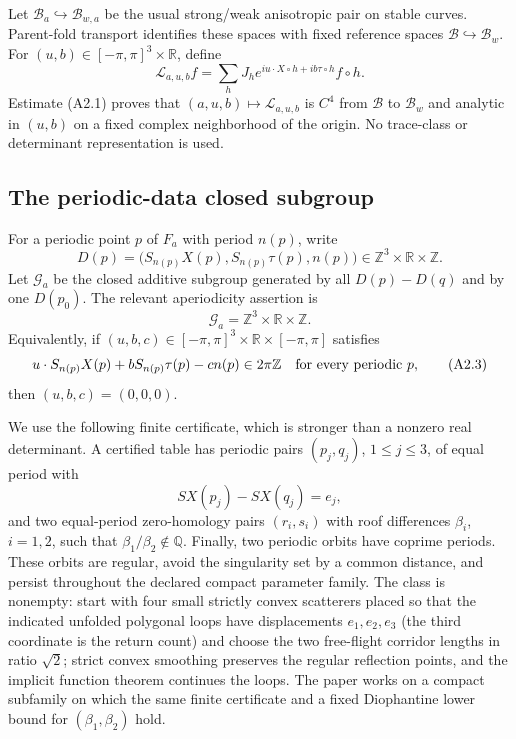 Let $\mathcal B_a\hookrightarrow\mathcal B_{w,a}$ be the usual strong/weak
anisotropic pair on stable curves.  Parent-fold transport identifies these
spaces with fixed reference spaces $\mathcal B\hookrightarrow\mathcal B_w$.
For $(u,b)\in[-\pi,\pi]^3\times\mathbb R$, define
\[
 \mathcal L_{a,u,b}f
 =\sum_h J_h e^{i u\cdot X\circ h+i b\tau\circ h}f\circ h.
\]
Estimate (A2.1) proves that $(a,u,b)\mapsto\mathcal L_{a,u,b}$ is $C^4$ from
$\mathcal B$ to $\mathcal B_w$ and analytic in $(u,b)$ on a fixed complex
neighborhood of the origin.  No trace-class or determinant representation is
used.

\subsection{The periodic-data closed subgroup}

For a periodic point $p$ of $F_a$ with period $n(p)$, write
\[
 D(p)=\bigl(S_{n(p)}X(p),S_{n(p)}\tau(p),n(p)\bigr)
       \in\mathbb Z^3\times\mathbb R\times\mathbb Z.
\]
Let $\mathscr G_a$ be the closed additive subgroup generated by all
$D(p)-D(q)$ and by one $D(p_0)$.  The relevant aperiodicity assertion is
\[
 \mathscr G_a=\mathbb Z^3\times\mathbb R\times\mathbb Z.       \tag{A2.2}
\]
Equivalently, if $(u,b,c)\in[-\pi,\pi]^3\times\mathbb R\times[-\pi,\pi]$
satisfies
\[
 u\cdot S_{n(p)}X(p)+bS_{n(p)}\tau(p)-c n(p)\in2\pi\mathbb Z
 \quad\hbox{for every periodic }p,                         \tag{A2.3}
\]
then $(u,b,c)=(0,0,0)$.

We use the following finite certificate, which is stronger than a nonzero real
determinant.  A certified table has periodic pairs $(p_j,q_j)$,
$1\le j\le3$, of equal period with
\[
 S X(p_j)-S X(q_j)=e_j,
\]
and two equal-period zero-homology pairs $(r_i,s_i)$ with roof differences
$\beta_i$, $i=1,2$, such that $\beta_1/\beta_2\notin\mathbb Q$.  Finally, two
periodic orbits have coprime periods.  These orbits are regular, avoid the
singularity set by a common distance, and persist throughout the declared
compact parameter family.  The class is nonempty: start with four small
strictly convex scatterers placed so that the indicated unfolded polygonal
loops have displacements $e_1,e_2,e_3$ (the third coordinate is the return
count) and choose the two free-flight corridor lengths in ratio $\sqrt2$;
strict convex smoothing preserves the regular reflection points, and the
implicit function theorem continues the loops.  The paper works on a compact
subfamily on which the same finite certificate and a fixed Diophantine lower
bound for $(\beta_1,\beta_2)$ hold.

